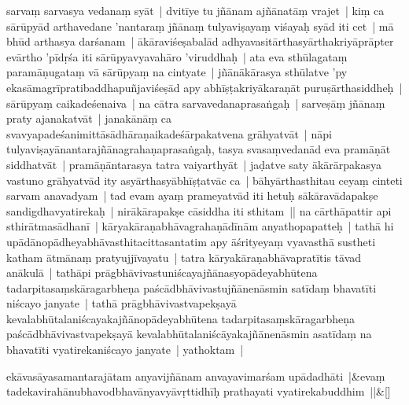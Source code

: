 \documentclass[article,12pt,a4paper]{memoir}%
\newcounter{parCount}
\begin{document}
sarvaṃ sarvasya vedanaṃ syāt | dvitīye tu jñānam ajñānatāṃ vrajet | kiṃ ca sārūpyād arthavedane 'nantaraṃ jñānaṃ tulyaviṣayaṃ viśayaḥ syād iti cet | \label{thakur75-125.4} mā bhūd arthasya darśanam | ākāraviśeṣabalād adhyavasitārthasyārthakriyāprāpter evārtho 'pīdṛśa iti sārūpyavyavahāro 'viruddhaḥ | ata eva sthūlagataṃ paramāṇugataṃ vā sārūpyaṃ na cintyate | jñānākārasya sthūlatve 'py ekasāmagrīpratibaddhapuñjaviśeṣād apy abhīṣṭakriyākaraṇāt puruṣārthasiddheḥ | \label{thakur75-125.7} sārūpyaṃ caikadeśenaiva | na cātra sarvavedanaprasaṅgaḥ | sarveṣāṃ jñānaṃ praty ajanakatvāt | janakānāṃ ca svavyapadeśanimittāsādhāraṇaikadeśārpakatvena grāhyatvāt | \label{thakur75-125.9} nāpi tulyaviṣayānantarajñānagrahaṇaprasaṅgaḥ, tasya svasaṃvedanād eva pramāṇāt siddhatvāt | pramāṇāntarasya tatra vaiyarthyāt | jaḍatve saty ākārārpakasya vastuno grāhyatvād ity asyārthasyābhīṣṭatvāc ca | bāhyārthasthitau ceyaṃ cinteti sarvam anavadyam | \label{thakur75-125.12} tad evam ayaṃ prameyatvād iti hetuḥ sākāravādapakṣe sandigdhavyatirekaḥ | nirākārapakṣe cāsiddha iti sthitam || \label{thakur75-125.14} na cārthāpattir api sthirātmasādhanī | kāryakāraṇabhāvagrahaṇādīnām anyathopapatteḥ | \label{thakur75-125.15} tathā hi upādānopādheyabhāvasthitacittasantatim apy āśrityeyaṃ vyavasthā sustheti katham ātmānaṃ pratyujjīvayatu | tatra kāryakāraṇabhāvapratītis tāvad anākulā | tathāpi prāgbhāvivastuniścayajñānasyopādeyabhūtena tadarpitasaṃskāragarbheṇa paścādbhāvivastujñānenāsmin satīdaṃ bhavatīti niścayo janyate | tathā prāgbhāvivastvapekṣayā kevalabhūtalaniścayakajñānopādeyabhūtena tadarpitasaṃskāragarbheṇa paścādbhāvivastvapekṣayā kevalabhūtalaniścāyakajñānenāsmin asatīdaṃ na bhavatīti vyatirekaniścayo janyate | yathoktam |
	{}
	\pend%
      
	    
	    \stanza[\smallbreak]
	  ekāvasāyasamantarajātam anyavijñānam anvayavimarśam upādadhāti |&evaṃ tadekavirahānubhavodbhavānyavyāvṛttidhīḥ prathayati vyatirekabuddhim ||\&[\smallbreak]
	  
	  
	  
\end{document}
